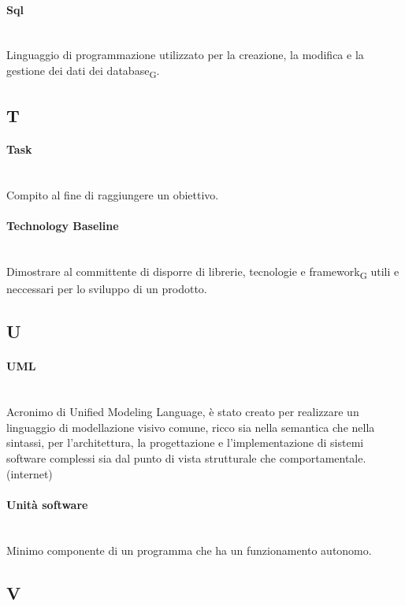 \paragraph{Sql}~\smallskip \\
Linguaggio di programmazione utilizzato per la creazione, la modifica e la gestione dei dati dei database\textsubscript{G}.
\newpage
{}
\subsection*{T}
\paragraph{Task}~\smallskip \\
Compito al fine di raggiungere un obiettivo.

\paragraph{Technology Baseline}~\smallskip \\
Dimostrare al committente di disporre di librerie, tecnologie e framework\textsubscript{G} utili e neccessari per lo sviluppo di un prodotto.

\newpage
{}
\subsection*{U}
\paragraph{UML}~\smallskip \\
Acronimo di Unified Modeling Language, è stato creato per realizzare un linguaggio di modellazione visivo comune, ricco 
sia nella semantica che nella sintassi, per l'architettura, la progettazione e l'implementazione di sistemi 
software complessi sia dal punto di vista strutturale che comportamentale. (internet)

\paragraph{Unità software}~\smallskip \\
Minimo componente di un programma che ha un funzionamento autonomo.
\newpage
{}
\subsection*{V}
